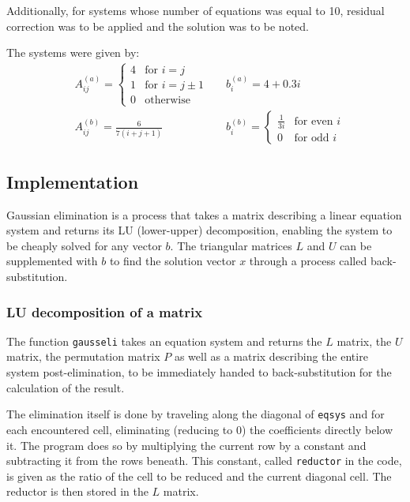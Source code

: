 \documentclass{article}
\begin{document}
	Additionally, for systems whose number of equations was equal to 10,
	residual correction was to be applied and the solution was to be noted.

	The systems were given by:
	\begin{align*}
		&A_{ij}^{(a)} =
		\begin{cases}
			4 & \text{for } i = j \\
			1 & \text{for } i = j \pm 1 \\
			0 & \text{otherwise}
		\end{cases}
		&&
		b_i^{(a)} = 4 + 0.3i
		\\
		&A_{ij}^{(b)} = \frac{6}{7(i + j + 1)}
		&&
		b_i^{(b)} =
		\begin{cases}
			\frac{1}{3i} & \text{for even } i\\
			0 & \text{for odd } i
		\end{cases}
	\end{align*}

	\subsection{Implementation}

	Gaussian elimination is a process that takes a matrix describing a linear
	equation system and returns its LU (lower-upper) decomposition, enabling the
	system to be cheaply solved for any vector $b$. The triangular matrices $L$
	and $U$ can be supplemented with $b$ to find the solution vector $x$ through
	a process called back-substitution.

	\subsubsection{LU decomposition of a matrix}

	The function \texttt{gausseli} takes an equation system and returns the $L$
	matrix, the $U$ matrix, the permutation matrix $P$ as well as a matrix
	describing the entire system post-elimination, to be immediately handed to
	back-substitution for the calculation of the result.

	The elimination itself is done by traveling along the diagonal of
	\texttt{eqsys} and for each encountered cell, eliminating (reducing to $0$)
	the coefficients directly below it. The program does so by multiplying the
	current row by a constant and subtracting it from the rows beneath.
	This constant, called \texttt{reductor} in the code, is given as the
	ratio of the cell to be reduced and the current diagonal cell. The reductor
	is then stored in the $L$ matrix.
\end{document}
